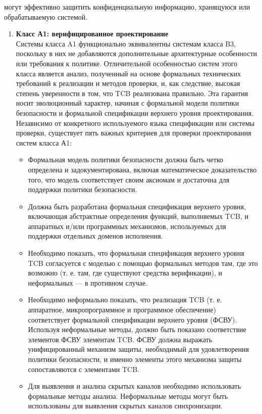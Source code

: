 \begin{enumerate}
	могут эффективно защитить конфиденциальную информацию, хранящуюся или обрабатываемую системой.
	\begin{enumerate}
		\item{\textbf{Класс А1: верифицированное проектирование}}\\
		Системы класса A1 функционально эквивалентны системам класса B3, поскольку в них не добавляются дополнительные архитектурные особенности или требования к политике. Отличительной
		особенностью систем этого класса является анализ, полученный на основе формальных технических требований к реализации и методов проверки, и, как следствие, высокая степень
		уверенности в том, что TCB реализована правильно. Эта гарантия носит эволюционный характер, начиная с формальной модели политики безопасности и формальной спецификации верхнего
		уровня проектирования. Независимо от конкретного используемого языка спецификации или системы проверки, существует пять важных критериев для проверки проектирования систем класса А1:
		\begin{itemize}
			\item{}  Формальная модель политики безопасности должна быть четко определена и задокументирована, включая математическое доказательство того, что модель соответствует
			своим аксиомам и достаточна для поддержки политики безопасности.
			\item{} Должна быть разработана формальная спецификация верхнего уровня, включающая абстрактные определения функций, выполняемых TCB, и аппаратных и/или программных механизмов,
			используемых для поддержки отдельных доменов исполнения.
			\item{} Необходимо показать, что формальная спецификация верхнего уровня TCB согласуется с моделью с помощью формальных методов там, где это возможно
			(т. е. там, где существуют средства верификации), и неформальных --- в противном случае.
			\item{} Необходимо неформально показать, что реализация TCB (т. е. аппаратное, микропрограммное и программное обеспечение) соответствует формальной спецификации верхнего уровня (ФСВУ).
			Используя неформальные методы, должно быть показано соответствие элементов ФСВУ элементам TCB. ФСВУ должна выражать унифицированный механизм защиты, необходимый для удовлетворения политики
			безопасности, и именно элементы этого механизма защиты сопоставляются с элементами TCB.
			\item{} Для выявления и анализа скрытых каналов необходимо использовать формальные методы анализа. Неформальные методы могут быть использованы для выявления скрытых каналов синхронизации.

\end{itemize}
\end{enumerate}
\end{enumerate}
